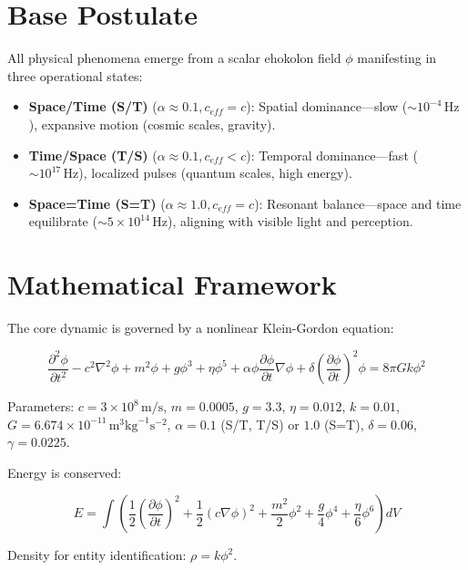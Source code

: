 \documentclass[11pt]{article}
\begin{document}
\section{Base Postulate}
All physical phenomena emerge from a scalar ehokolon field \(\phi\) manifesting in three operational states:
\begin{itemize}
    \item \textbf{Space/Time (S/T)} (\(\alpha \approx 0.1, c_{eff} = c\)): Spatial dominance—slow (\(\sim 10^{-4} \, \text{Hz}\)), expansive motion (cosmic scales, gravity).
    \item \textbf{Time/Space (T/S)} (\(\alpha \approx 0.1, c_{eff} < c\)): Temporal dominance—fast (\(\sim 10^{17} \, \text{Hz}\)), localized pulses (quantum scales, high energy).
    \item \textbf{Space=Time (S=T)} (\(\alpha \approx 1.0, c_{eff} = c\)): Resonant balance—space and time equilibrate (\(\sim 5 \times 10^{14} \, \text{Hz}\)), aligning with visible light and perception.
\end{itemize}

\section{Mathematical Framework}
The core dynamic is governed by a nonlinear Klein-Gordon equation:

\begin{equation}
\frac{\partial^2 \phi}{\partial t^2} - c^2 \nabla^2 \phi + m^2 \phi + g \phi^3 + \eta \phi^5 + \alpha \phi \frac{\partial \phi}{\partial t} \nabla \phi + \delta \left( \frac{\partial \phi}{\partial t} \right)^2 \phi = 8 \pi G k \phi^2
\label{eq:efm_kge_config}
\end{equation}

Parameters: \(c = 3 \times 10^8 \, \text{m/s}\), \(m = 0.0005\), \(g = 3.3\), \(\eta = 0.012\), \(k = 0.01\), \(G = 6.674 \times 10^{-11} \, \text{m}^3 \text{kg}^{-1} \text{s}^{-2}\), \(\alpha = 0.1\) (S/T, T/S) or \(1.0\) (S=T), \(\delta = 0.06\), \(\gamma = 0.0225\).

Energy is conserved:

\begin{equation}
E = \int \left( \frac{1}{2} \left(\frac{\partial \phi}{\partial t}\right)^2 + \frac{1}{2} (c \nabla \phi)^2 + \frac{m^2}{2} \phi^2 + \frac{g}{4} \phi^4 + \frac{\eta}{6} \phi^6 \right) dV
\end{equation}

Density for entity identification: \(\rho = k \phi^2\).
\end{document}
